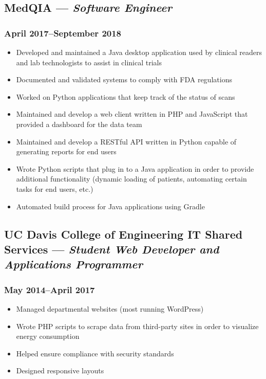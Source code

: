 \documentclass{article}
\begin{document}
\begin{minipage}[t]{.6\textwidth}
\subsection*{MedQIA --- \textit{Software Engineer}}
\subsubsection*{April 2017--September 2018}
\begin{itemize}
    \item Developed and maintained a Java desktop application used by clinical readers and lab technologists to assist in clinical trials
    \item Documented and validated systems to comply with FDA regulations
    \item Worked on Python applications that keep track of the status of scans
    \item Maintained and develop a web client written in PHP and JavaScript that provided a dashboard for the data team
    \item Maintained and develop a RESTful API written in Python capable of generating reports for end users
    \item Wrote Python scripts that plug in to a Java application in order to provide additional functionality (dynamic loading of patients, automating certain tasks for end users, etc.)
    \item Automated build process for Java applications using Gradle
\end{itemize}
\subsection*{UC Davis College of Engineering IT Shared Services --- \textit{Student Web Developer and Applications Programmer}}
\subsubsection*{May 2014--April 2017}
\begin{itemize}
    \item Managed departmental websites (most running WordPress)
    \item Wrote PHP scripts to scrape data from third-party sites in order to visualize energy consumption
    \item Helped ensure compliance with security standards
    \item Designed responsive layouts
\end{itemize}
\end{minipage}
\end{document}
